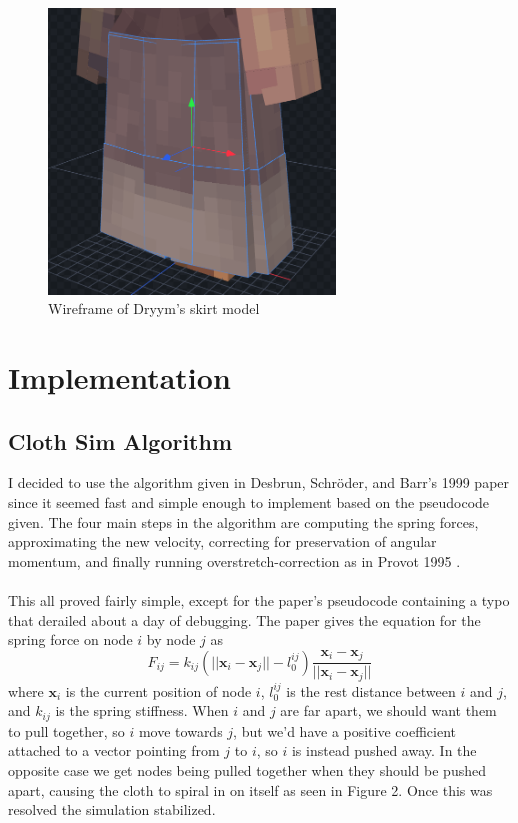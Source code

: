 \documentclass[12pt]{article}
\begin{document}
\begin{figure}[h]
    \begin{center}
        \includegraphics[width=3in]{images/dryym-skirt-blockoutlines-back.png}
    \end{center}
    \caption{Wireframe of Dryym's skirt model}
\end{figure}

\section{Implementation}

\subsection{Cloth Sim Algorithm}

I decided to use the algorithm given in Desbrun, Schröder, and Barr's 1999 paper \cite{interanim} since it seemed fast and simple enough to implement based on the pseudocode given. The four main steps in the algorithm are computing the spring forces, approximating the new velocity, correcting for preservation of angular momentum, and finally running overstretch-correction as in Provot 1995 \cite{Provot1995:17}.\\
\\
This all proved fairly simple, except for the paper's pseudocode containing a typo that derailed about a day of debugging. The paper gives the equation for the spring force on node $i$ by node $j$ as
$$ F_{ij} = k_{ij} (||\mathbf x _i - \mathbf x_j|| - l_0^{ij})\frac{\mathbf x _i - \mathbf x_j}{||\mathbf x _i - \mathbf x_j||}$$
where $\mathbf x_i$ is the current position of node $i$, $l_0^{ij}$ is the rest distance between $i$ and $j$, and $k_{ij}$ is the spring stiffness. When $i$ and $j$ are far apart, we should want them to pull together, so $i$ move towards $j$, but we'd have a positive coefficient attached to a vector pointing from $j$ to $i$, so $i$ is instead pushed away. In the opposite case we get nodes being pulled together when they should be pushed apart, causing the cloth to spiral in on itself as seen in Figure 2. Once this was resolved the simulation stabilized.
\end{document}
